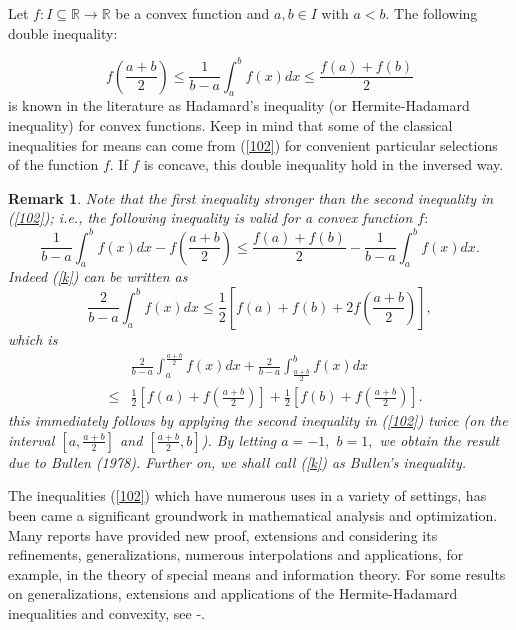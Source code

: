 \documentclass{amsart}
\theoremstyle{plain}
\newtheorem{remark}{Remark}
\numberwithin{equation}{section}
\begin{document}
Let $f:I\subseteq 
\mathbb{R}
\rightarrow 
\mathbb{R}
$ be a convex function and $a,b\in I$ with $a<b$. The following double
inequality:$\ $

\begin{equation}
f\left( \frac{a+b}{2}\right) \leq \frac{1}{b-a}\int_{a}^{b}f\left( x\right)
dx\leq \frac{f\left( a\right) +f\left( b\right) }{2}  \label{102}
\end{equation}is known in the literature as Hadamard's inequality (or Hermite-Hadamard
inequality) for convex functions. Keep in mind that some of the classical
inequalities for means can come from (\ref{102}) for convenient particular
selections of the function $f.$ If $f$ is concave, this double inequality
hold in the inversed way.

\begin{remark}
\cite{SEL} Note that the first inequality stronger than the second
inequality in (\ref{102}); i.e., the following inequality is valid for a
convex function $f:$\begin{equation}
\frac{1}{b-a}\int_{a}^{b}f\left( x\right) dx-f\left( \frac{a+b}{2}\right)
\leq \frac{f\left( a\right) +f\left( b\right) }{2}-\frac{1}{b-a}\int_{a}^{b}f\left( x\right) dx.  \label{k}
\end{equation}Indeed (\ref{k}) can be written as 
\begin{equation}
\frac{2}{b-a}\int_{a}^{b}f\left( x\right) dx\leq \frac{1}{2}\left[ f\left(
a\right) +f\left( b\right) +2f\left( \frac{a+b}{2}\right) \right] ,
\label{z}
\end{equation}which is 
\begin{eqnarray*}
&&\frac{2}{b-a}\int_{a}^{\frac{a+b}{2}}f\left( x\right) dx+\frac{2}{b-a}\int_{\frac{a+b}{2}}^{b}f\left( x\right) dx \\
&\leq &\frac{1}{2}\left[ f\left( a\right) +f\left( \frac{a+b}{2}\right) \right] +\frac{1}{2}\left[ f\left( b\right) +f\left( \frac{a+b}{2}\right) \right] .
\end{eqnarray*}this immediately follows by applying the second inequality in (\ref{102})
twice (on the interval $\left[ a,\frac{a+b}{2}\right] $ and $\left[ \frac{a+b}{2},b\right] $). By letting $a=-1,$ $b=1,$ we obtain the result due to
Bullen (1978). Further on, we shall call (\ref{k}) as Bullen's inequality.
\end{remark}

The inequalities (\ref{102}) which have numerous uses in a variety of
settings, has been came a significant groundwork in mathematical analysis
and optimization. Many reports have provided new proof, extensions and
considering its refinements, generalizations, numerous interpolations and
applications, for example, in the theory of special means and information
theory. For some results on generalizations, extensions and applications of
the Hermite-Hadamard inequalities and convexity, see \cite{SSD1}-\cite{SEL}.
\end{document}
